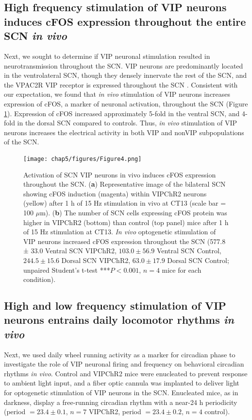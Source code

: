 \subsection*{High frequency stimulation of VIP neurons induces cFOS expression throughout the entire SCN \textit{in vivo}}
Next, we sought to determine if VIP neuronal stimulation resulted in neurotransmission throughout the SCN.
VIP neurons are predominantly located in the ventrolateral SCN, though they densely innervate the rest of the SCN, and the VPAC2R VIP receptor is expressed throughout the SCN \cite{An2012}.
Consistent with our expectation, we found that \textit{in vivo} stimulation of VIP neurons increases expression of cFOS, a marker of neuronal activation, throughout the SCN (Figure \ref{fig:cm4}).
Expression of cFOS increased approximately 5-fold in the ventral SCN, and 4-fold in the dorsal SCN compared to controls.
Thus, \textit{in vivo} stimulation of VIP neurons increases the electrical activity in both VIP and nonVIP subpopulations of the SCN.
\clearpage
\begin{figure}[p]
    \begin{center}
        \texttt{[image: chap5/figures/Figure4.png]}
    \end{center}
    \caption{\label{fig:cm4} Activation of SCN VIP neurons in vivo induces cFOS expression throughout the SCN. 
    (\textbf{a}) Representative image of the bilateral SCN showing cFOS induction (magenta) within VIPChR2 neurons (yellow) after 1 h of 15 Hz stimulation in vivo at CT13 (scale bar = 100 $\mu$m). 
    (\textbf{b}) The number of SCN cells expressing cFOS protein was higher in VIPChR2 (bottom) than control (top panel) mice after 1 h of 15 Hz stimulation at CT13. \textit{In vivo} optogenetic stimulation of VIP neurons increased cFOS expression throughout the SCN (577.8 ± 33.0 Ventral SCN VIPChR2, $103.0 \pm 56.9$ Ventral SCN Control, $244.5 \pm 15.6$ Dorsal SCN VIPChR2, $63.0 \pm 17.9$ Dorsal SCN Control; unpaired Student's t-test ***$P<0.001$, $n = 4$ mice for each condition).
    }
\end{figure}

\clearpage
\subsection*{High and low frequency stimulation of VIP neurons entrains daily locomotor rhythms \textit{in vivo}}

Next, we used daily wheel running activity as a marker for circadian phase to investigate the role of VIP neuronal firing and frequency on behavioral circadian rhythms \textit{in vivo}.
Control and VIPChR2 mice were enucleated to prevent response to ambient light input, and a fiber optic cannula was implanted to deliver light for optogenetic stimulation of VIP neurons in the SCN.
Enucleated mice, as in darkness, display a free-running circadian rhythm with a near-24 h periodicity (period $=23.4\pm0.1$, $n=7$ VIPChR2, period $=23.4\pm0.2$, $n=4$ control).

